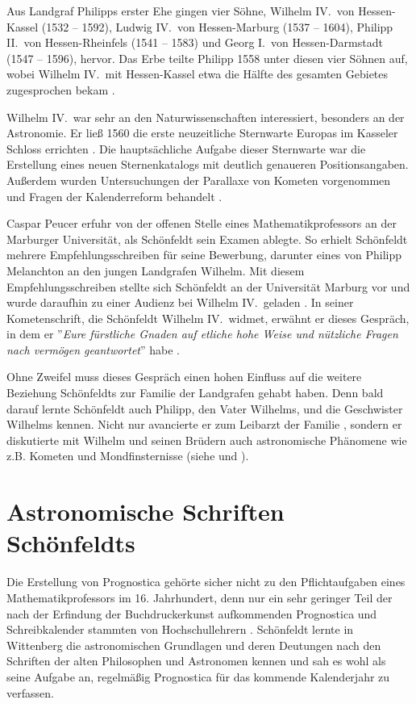 \documentclass[12pt]{article}
\begin{document}
Aus Landgraf Philipps erster Ehe gingen vier Söhne, Wilhelm IV.\ von Hessen-Kassel (1532 -- 1592), Ludwig IV.\ von Hessen-Marburg (1537 -- 1604), Philipp II.\ von Hessen-Rheinfels (1541 -- 1583) und Georg I.\ von Hessen-Darmstadt (1547 -- 1596), hervor. Das Erbe teilte Philipp 1558 unter diesen vier Söhnen auf, wobei Wilhelm IV.\ mit Hessen-Kassel etwa die Hälfte des gesamten Gebietes zugesprochen bekam \cite{Wilhelm1558}.

Wilhelm IV.\ war sehr an den Naturwissenschaften interessiert, besonders an der Astronomie. Er ließ 1560 die erste neuzeitliche Sternwarte Europas im Kasseler Schloss errichten \cite{Mackensen1979}. Die hauptsächliche Aufgabe dieser Sternwarte war die Erstellung eines neuen Sternenkatalogs mit deutlich genaueren Positionsangaben. Außerdem wurden Untersuchungen der Parallaxe von Kometen vorgenommen und Fragen der Kalenderreform behandelt \cite{Hamel2002}.

Caspar Peucer erfuhr von der offenen Stelle eines Mathematikprofessors an der Marburger Universität, als Schönfeldt sein Examen ablegte.
So erhielt Schönfeldt mehrere Empfehlungsschreiben für seine Bewerbung, darunter eines von Philipp Melanchton an den jungen Landgrafen Wilhelm. Mit diesem Empfehlungsschreiben stellte sich Schönfeldt an der Universität Marburg vor und wurde daraufhin zu einer Audienz bei Wilhelm IV.\ geladen \cite{Bechstein1875}. In seiner Kometenschrift, die Schönfeldt Wilhelm IV.\ widmet, erwähnt er dieses Gespräch, in dem er ''\emph{Eure fürstliche Gnaden auf etliche hohe Weise und nützliche Fragen nach vermögen geantwortet}'' habe \cite{Schoenfeldt1558}. 

Ohne Zweifel muss dieses Gespräch einen hohen Einfluss auf die weitere Beziehung Schönfeldts zur Familie der Landgrafen gehabt haben. Denn bald darauf lernte Schönfeldt auch Philipp, den Vater Wilhelms, und die Geschwister Wilhelms kennen. Nicht nur avancierte er zum Leibarzt der Familie \cite{Saloch2006}, sondern er diskutierte mit Wilhelm und seinen Brüdern auch astronomische Phänomene wie z.B. Kometen und Mondfinsternisse (siehe \cite{Wilhelm1586} und \cite{Wilhelm1580}).

\section{Astronomische Schriften Schönfeldts}

Die Erstellung von Prognostica gehörte sicher nicht zu den Pflichtaufgaben eines Mathematikprofessors im 16. Jahrhundert, denn nur ein sehr geringer Teil der nach der Erfindung der Buchdruckerkunst aufkommenden Prognostica und Schreibkalender stammten von Hochschullehrern \cite{Kremer2006}. Schönfeldt lernte in Wittenberg die astronomischen Grundlagen und deren Deutungen nach den Schriften der alten Philosophen und Astronomen kennen und sah es wohl als seine Aufgabe an, regelmäßig Prognostica für das kommende Kalenderjahr zu verfassen. 
\end{document}
